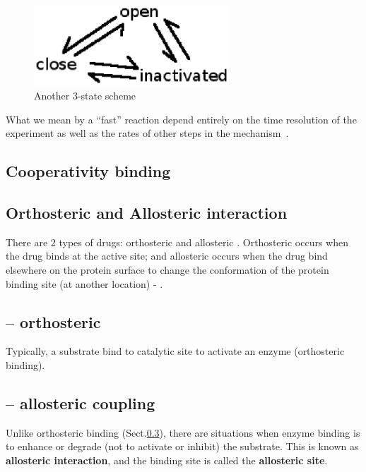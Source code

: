 \begin{figure}[hbt]
  \centerline{\includegraphics[height=3cm]{./images/3state_scheme.eps}}
  \caption{Another 3-state scheme}
  \label{fig:3state_scheme}
\end{figure}

\begin{framed}

What we mean by a ``fast'' reaction depend entirely on the time
resolution of the experiment as well as the rates of other steps in
the mechanism~\citep{colquhoun1994isc}.
\end{framed}


\subsection{Cooperativity binding}


\subsection{Orthosteric and Allosteric interaction}
\label{sec:orthosteric_allosteric}

There are 2 types of drugs: orthosteric and allosteric \citep{nussinov2012}.
Orthosteric occurs when the drug binds at the active site; and allosteric occurs
when the drug bind elsewhere on the protein surface to change the conformation
of the protein binding site (at another location) - .


\subsection{-- orthosteric}
\label{sec:orthosteric-binding}

Typically, a substrate bind to catalytic site to activate an enzyme (orthosteric
binding).

\subsection{-- allosteric coupling}
\label{sec:allosteric-coupling}
\label{sec:allosteric-interaction}

Unlike orthosteric binding (Sect.\ref{sec:orthosteric-binding}), there are
situations when enzyme binding is to enhance or degrade (not to activate or
inhibit) the substrate. This is known as {\bf allosteric interaction}, and the
binding site is called the {\bf allosteric site}.

